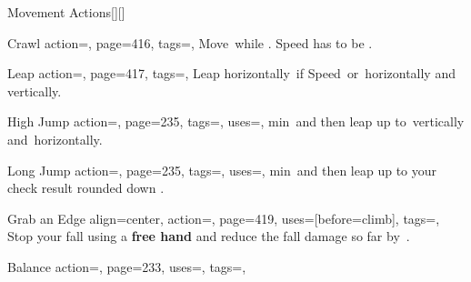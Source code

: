 \begin{PageBack}
\begin{Tables}{\backTableHeight}
\begin{Table}{Movement Actions}[][]
            \begin{entry}{Crawl}{%
                action=,
                page=416,
                tags=\Move,
            }
                Move \,\Feet while \Prone. Speed has to be .
            \end{entry}
            \breakLine
            \begin{entry}{Leap}{%
                action=,
                page=417,
                tags=\Move,
            }
                Leap horizontally {\,\Feet if Speed \,\Feet{}}\hfill or \,\Feet horizontally and \,\Feet vertically.
            \end{entry}
            \begin{entry}{High Jump}{%
                action=,
                page=235,
                tags=\Move,
                uses={\Athletics[][val=30]},
            }
                 min \,\Feet and then leap up to \,\Feet vertically
                and \,\Feet horizontally.\hfill {}
            \end{entry}
            \begin{entry}{Long Jump}{%
                action=,
                page=235,
                tags=\Move,
                uses={\Athletics[][val=15]},
            }
                 min \,\Feet and then leap up to your check result rounded down . \hfill {}\; 
            \end{entry}
            \begin{entry}{Grab an Edge}{%
                align=center,
                action=,
                page=419,
                uses={[before=climb]},
                tags=\Manipulate,
            }
                Stop your fall using a \textbf{ free hand} and reduce the fall damage so far by \,\Feet.\\\hfill {}
            \end{entry}
            \breakLine
            \begin{entry}{Balance}{%
                action=,
                page=233,
                uses=\Acrobatics,
                tags=\Move,
            }

\end{entry}
\end{Table}
\end{Tables}
\end{PageBack}
